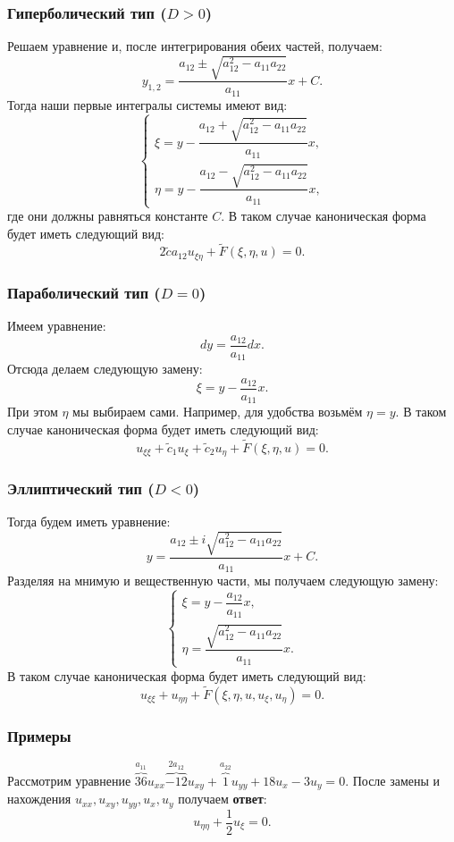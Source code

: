 \subsubsection*{Гиперболический тип ($D > 0$)}
Решаем уравнение и, после интегрирования обеих частей, получаем:
$$ y_{1,2} = \dfrac{a_{12} \pm \sqrt{a_{12}^2 - a_{11} a_{22}}}{a_{11}} x + C. $$
Тогда наши первые интегралы системы имеют вид:
$$
\begin{cases}
\xi = y - \dfrac{a_{12} + \sqrt{a_{12}^2 - a_{11} a_{22}}}{a_{11}} x, \\
\eta = y - \dfrac{a_{12} - \sqrt{a_{12}^2 - a_{11} a_{22}}}{a_{11}} x,
\end{cases}
$$
где они должны равняться константе $C$. В таком случае каноническая форма будет иметь следующий вид:
$$ 2 \tilde{c} a_{12} u_{\xi \eta} + \tilde{F}(\xi, \eta, u) = 0. $$

\subsubsection*{Параболический тип ($D = 0$)}
Имеем уравнение:
$$ dy = \dfrac{a_{12}}{a_{11}} dx. $$
Отсюда делаем следующую замену:
$$ \xi = y - \dfrac{a_{12}}{a_{11}} x. $$
При этом $\eta$ мы выбираем сами. Например, для удобства возьмём $\eta = y$. В таком случае каноническая форма будет иметь следующий вид:
$$ u_{\xi \xi} + \tilde{c}_1 u_\xi + \tilde{c}_2 u_\eta + \tilde{F}(\xi, \eta, u) = 0. $$

\subsubsection*{Эллиптический тип ($D < 0$)}
Тогда будем иметь уравнение:
$$ y = \dfrac{a_{12} \pm i \sqrt{a_{12}^2 - a_{11} a_{22}}}{a_{11}} x + C. $$
Разделяя на мнимую и вещественную части, мы получаем следующую замену:
$$
\begin{cases}
\xi = y - \dfrac{a_{12}}{a_{11}} x, \\
\eta = \dfrac{\sqrt{a_{12}^2 - a_{11} a_{22}}}{a_{11}} x.
\end{cases}
$$
В таком случае каноническая форма будет иметь следующий вид:
$$ u_{\xi \xi} + u_{\eta \eta} + \tilde{F}(\xi, \eta, u, u_\xi, u_\eta) = 0. $$

\subsubsection*{Примеры}

\begin{example}
    Рассмотрим уравнение $\overbrace{36}^{a_{11}} u_{xx} \overbrace{-12}^{2 a_{12}} u_{xy} + \overbrace{1}^{a_{22}} u_{yy} + 18 u_x - 3 u_y = 0$. После замены и нахождения $u_{xx}, u_{xy}, u_{yy}, u_x, u_y$ получаем \textbf{ответ}:
    $$ u_{\eta \eta} + \dfrac{1}{2} u_\xi = 0. $$
\end{example}

